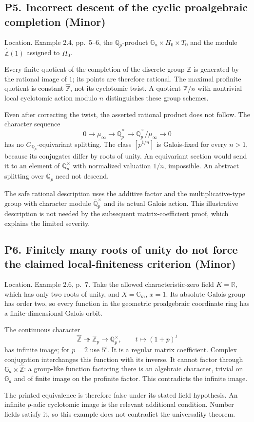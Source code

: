 \documentclass[10pt]{article}
\begin{document}
\subsection*{P5. Incorrect descent of the cyclic proalgebraic completion (Minor)}
Location. Example 2.4, pp. 5–6, the \(\mathbb Q_p\)-product \(\mathbb G_a\times H_0\times T_0\) and the module \(\widehat{\mathbb Z}(1)\) assigned to \(H_0\).\par
Every finite quotient of the completion of the discrete group \(\mathbb Z\) is generated by the rational image of \(1\); its points are therefore rational. The maximal profinite quotient is constant \(\widehat{\mathbb Z}\), not its cyclotomic twist. A quotient \(\mathbb Z/n\) with nontrivial local cyclotomic action modulo \(n\) distinguishes these group schemes.\par
Even after correcting the twist, the asserted rational product does not follow. The character sequence \[0\longrightarrow\mu_\infty\longrightarrow
 \overline{\mathbb Q}_p^\times\longrightarrow
 \overline{\mathbb Q}_p^\times/\mu_\infty\longrightarrow0\] has no \(G_{\mathbb Q_p}\)-equivariant splitting. The class \([p^{1/n}]\) is Galois-fixed for every \(n>1\), because its conjugates differ by roots of unity. An equivariant section would send it to an element of \(\mathbb Q_p^\times\) with normalized valuation \(1/n\), impossible. An abstract splitting over \(\overline{\mathbb Q}_p\) need not descend.\par
The safe rational description uses the additive factor and the multiplicative-type group with character module \(\overline{\mathbb Q}_p^\times\) and its actual Galois action. This illustrative description is not needed by the subsequent matrix-coefficient proof, which explains the limited severity.\par
\subsection*{P6. Finitely many roots of unity do not force the claimed local-finiteness criterion (Minor)}
Location. Example 2.6, p. 7. Take the allowed characteristic-zero field \(K=\mathbb R\), which has only two roots of unity, and \(X=\mathbb G_m\), \(x=1\). Its absolute Galois group has order two, so every function in the geometric proalgebraic coordinate ring has a finite-dimensional Galois orbit.\par
The continuous character \[\widehat{\mathbb Z}\twoheadrightarrow\mathbb Z_p
 \longrightarrow\mathbb Q_p^\times,\qquad
 t\longmapsto(1+p)^t\] has infinite image; for \(p=2\) use \(5^t\). It is a regular matrix coefficient. Complex conjugation interchanges this function with its inverse. It cannot factor through \(\mathbb G_a\times\widehat{\mathbb Z}\): a group-like function factoring there is an algebraic character, trivial on \(\mathbb G_a\) and of finite image on the profinite factor. This contradicts the infinite image.\par
The printed equivalence is therefore false under its stated field hypothesis. An infinite \(p\)-adic cyclotomic image is the relevant additional condition. Number fields satisfy it, so this example does not contradict the universality theorem.\par
\end{document}
